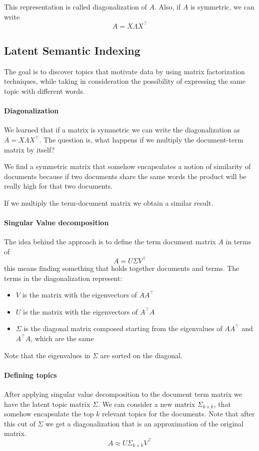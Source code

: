 This representation is called diagonalization of $A$.
Also, if $A$ is symmetric, we can write
$$A = X\varLambda X^{\top}$$

\subsection{Latent Semantic Indexing}
The goal is to discover topics that motivate data
by using matrix factorization techniques, while 
taking in consideration the possibility of expressing
the same topic with different words.

\paragraph{Diagonalization}
We learned that if a matrix is symmetric we can write the 
diagonalization as $A = X\varLambda X^{\top}$.
The question is, what happens if we multiply the 
document-term matrix by itself? 

We find a symmetric matrix that somehow encapsulates a notion of similarity 
of documents because if two documents share the same words the 
product will be really high for that two documents.

If we multiply the term-document matrix we obtain a similar result.

\paragraph{Singular Value decomposition}
The idea behind the approach is to define the term document matrix 
$A$ in terms of $$A = U \Sigma V^\top$$
this means finding something that holds together documents and terms. 
The terms in the diagonalization represent:
\begin{itemize}
    \item$V$ is the matrix with the eigenvectors of $AA^\top$
    \item$U$ is the matrix with the eigenvectors of $A^\top A$
    \item $\Sigma$ is the diagonal matrix composed starting from the eigenvalues
    of $A A^\top$ and $A^\top A$, which are the same
\end{itemize}
Note that the eigenvalues in $\Sigma$ are sorted on the diagonal.

\paragraph{Defining topics}
After applying singular value decomposition 
to the document term matrix we have the latent topic matrix
$\Sigma$.
We can consider a new matrix $\Sigma_{k \times k}$, that 
somehow encapsulate the top $k$ relevant topics for 
the documents.
Note that after this cut of $\Sigma$ we get a diagonalization 
that is an approximation of the original matrix.
$$A \approx U \Sigma_{k \times k} V^\top$$

